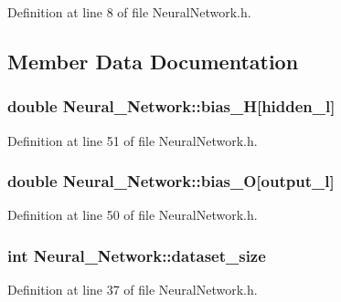 Definition at line 8 of file Neural\-Network.\-h.



\subsection{Member Data Documentation}
\hypertarget{a00003_a38808438a02d406a7ab54c8bf825752a}{
\subsubsection[{bias\-\_\-\-H}]{\setlength{\rightskip}{0pt plus 5cm}double Neural\-\_\-\-Network\-::bias\-\_\-\-H\mbox{[}{\bf hidden\-\_\-l}\mbox{]}\hspace{0.3cm}{\ttfamily [private]}}}\label{d1/d7c/a00003_a38808438a02d406a7ab54c8bf825752a}


Definition at line 51 of file Neural\-Network.\-h.

\hypertarget{a00003_a8f26363ac0ccda6f04df35e68164cd3a}{
\subsubsection[{bias\-\_\-\-O}]{\setlength{\rightskip}{0pt plus 5cm}double Neural\-\_\-\-Network\-::bias\-\_\-\-O\mbox{[}{\bf output\-\_\-l}\mbox{]}\hspace{0.3cm}{\ttfamily [private]}}}\label{d1/d7c/a00003_a8f26363ac0ccda6f04df35e68164cd3a}


Definition at line 50 of file Neural\-Network.\-h.

\hypertarget{a00003_a8fe39196b36a38696abd679328dd8232}{
\subsubsection[{dataset\-\_\-size}]{\setlength{\rightskip}{0pt plus 5cm}int Neural\-\_\-\-Network\-::dataset\-\_\-size\hspace{0.3cm}{\ttfamily [private]}}}\label{d1/d7c/a00003_a8fe39196b36a38696abd679328dd8232}


Definition at line 37 of file Neural\-Network.\-h.

